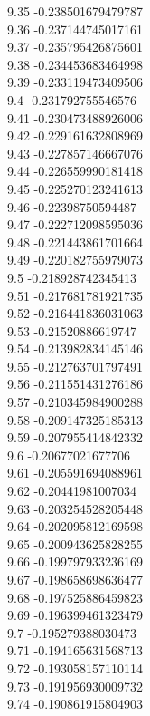 {9.35	-0.238501679479787\\
9.36	-0.237144745017161\\
9.37	-0.235795426875601\\
9.38	-0.234453683464998\\
9.39	-0.233119473409506\\
9.4	-0.231792755546576\\
9.41	-0.230473488926006\\
9.42	-0.229161632808969\\
9.43	-0.227857146667076\\
9.44	-0.226559990181418\\
9.45	-0.225270123241613\\
9.46	-0.22398750594487\\
9.47	-0.222712098595036\\
9.48	-0.221443861701664\\
9.49	-0.220182755979073\\
9.5	-0.218928742345413\\
9.51	-0.217681781921735\\
9.52	-0.216441836031063\\
9.53	-0.21520886619747\\
9.54	-0.213982834145146\\
9.55	-0.212763701797491\\
9.56	-0.211551431276186\\
9.57	-0.210345984900288\\
9.58	-0.209147325185313\\
9.59	-0.207955414842332\\
9.6	-0.20677021677706\\
9.61	-0.205591694088961\\
9.62	-0.20441981007034\\
9.63	-0.203254528205448\\
9.64	-0.202095812169598\\
9.65	-0.200943625828255\\
9.66	-0.199797933236169\\
9.67	-0.198658698636477\\
9.68	-0.197525886459823\\
9.69	-0.196399461323479\\
9.7	-0.195279388030473\\
9.71	-0.194165631568713\\
9.72	-0.193058157110114\\
9.73	-0.191956930009732\\
9.74	-0.190861915804903\\
}
